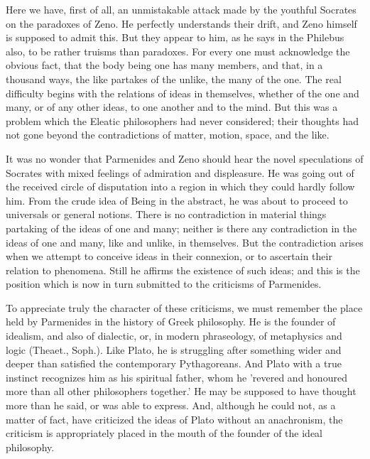 Here we have, first of all, an unmistakable attack made by the youthful
Socrates on the paradoxes of Zeno. He perfectly understands their drift,
and Zeno himself is supposed to admit this. But they appear to him, as
he says in the Philebus also, to be rather truisms than paradoxes. For
every one must acknowledge the obvious fact, that the body being one
has many members, and that, in a thousand ways, the like partakes of
the unlike, the many of the one. The real difficulty begins with the
relations of ideas in themselves, whether of the one and many, or of
any other ideas, to one another and to the mind. But this was a problem
which the Eleatic philosophers had never considered; their thoughts had
not gone beyond the contradictions of matter, motion, space, and the
like.

It was no wonder that Parmenides and Zeno should hear the novel
speculations of Socrates with mixed feelings of admiration and
displeasure. He was going out of the received circle of disputation into
a region in which they could hardly follow him. From the crude idea of
Being in the abstract, he was about to proceed to universals or general
notions. There is no contradiction in material things partaking of the
ideas of one and many; neither is there any contradiction in the ideas
of one and many, like and unlike, in themselves. But the contradiction
arises when we attempt to conceive ideas in their connexion, or to
ascertain their relation to phenomena. Still he affirms the existence of
such ideas; and this is the position which is now in turn submitted to
the criticisms of Parmenides.

To appreciate truly the character of these criticisms, we must remember
the place held by Parmenides in the history of Greek philosophy. He
is the founder of idealism, and also of dialectic, or, in modern
phraseology, of metaphysics and logic (Theaet., Soph.). Like Plato,
he is struggling after something wider and deeper than satisfied the
contemporary Pythagoreans. And Plato with a true instinct recognizes
him as his spiritual father, whom he 'revered and honoured more than all
other philosophers together.' He may be supposed to have thought more
than he said, or was able to express. And, although he could not, as
a matter of fact, have criticized the ideas of Plato without an
anachronism, the criticism is appropriately placed in the mouth of the
founder of the ideal philosophy.

